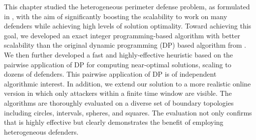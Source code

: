 This chapter studied the heterogeneous perimeter defense problem, as formulated in \cite{adler2022role}, with the aim of
significantly boosting the scalability to work on many defenders while achieving high levels of solution optimality.
Toward achieving this goal, we developed an exact integer programming-based algorithm with better scalability than the original dynamic programming (DP) based algorithm from \cite{adler2022role}. We then further developed a fast and highly-effective heuristic based on the pairwise application of DP for computing near-optimal solutions, scaling to dozens of defenders.
%
This pairwise application of DP is of independent algorithmic interest. 
%
In addition, we extend our solution to a more realistic online version in which only attackers within a finite time window are visible. 
%
The algorithms are thoroughly evaluated on a diverse set of boundary topologies including circles, intervals, spheres, and squares. 
%
The evaluation not only confirms that \ours is highly effective but clearly demonstrates the benefit of employing heterogeneous defenders. 